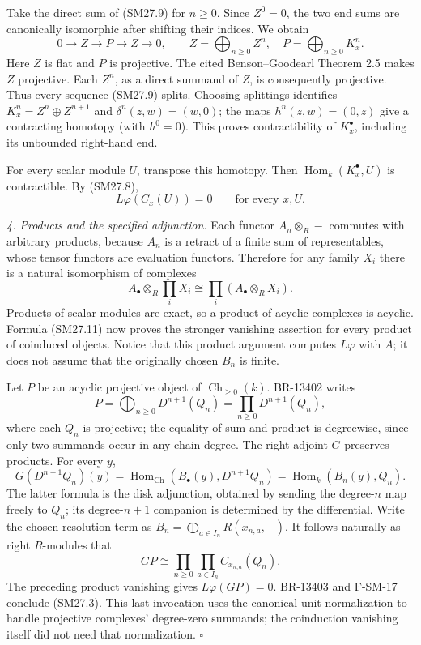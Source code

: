 \documentclass[11pt,a4paper]{article}
\theoremstyle{definition}\newtheorem{definition}[theorem]{Definition}
\theoremstyle{remark}\newtheorem{remark}[theorem]{Remark}
\begin{document}
Take the direct sum of (SM27.9) for \(n\ge0\).
Since \(Z^0=0\), the two end sums are canonically isomorphic after
shifting their indices.  We obtain
\[
 0\longrightarrow Z\longrightarrow P\longrightarrow Z
 \longrightarrow0,\qquad
 Z=\bigoplus_{n\ge0}Z^n,\quad P=\bigoplus_{n\ge0}K_x^n.
 \tag{SM27.10}
\]
Here \(Z\) is flat and \(P\) is projective.
The cited Benson--Goodearl Theorem 2.5 makes \(Z\) projective.
Each \(Z^n\), as a direct summand of \(Z\), is consequently
projective.  Thus every sequence (SM27.9) splits.
Choosing splittings identifies
\(K_x^n=Z^n\oplus Z^{n+1}\) and
\(\delta^n(z,w)=(w,0)\); the maps
\(h^n(z,w)=(0,z)\) give a contracting homotopy
(with \(h^0=0\)).  This proves contractibility of \(K_x^\bullet\),
including its unbounded right-hand end.

For every scalar module \(U\), transpose this homotopy.
Then \(\operatorname{Hom}_k(K_x^\bullet,U)\) is contractible.
By (SM27.8),
\[
 L\varphi(C_x(U))=0\qquad\text{for every }x,U.
 \tag{SM27.11}
\]

\emph{4. Products and the specified adjunction.}
Each functor \(A_n\otimes_R-\) commutes with arbitrary products,
because \(A_n\) is a retract of a finite sum of representables,
whose tensor functors are evaluation functors.
Therefore for any family \(X_i\) there is a natural isomorphism of
complexes
\[
 A_\bullet\otimes_R\prod_iX_i
   \cong\prod_i(A_\bullet\otimes_R X_i).
 \tag{SM27.12}
\]
Products of scalar modules are exact, so a product of acyclic
complexes is acyclic.  Formula (SM27.11) now proves the stronger
vanishing assertion for every product of coinduced objects.
Notice that this product argument computes \(L\varphi\) with \(A\);
it does not assume that the originally chosen \(B_n\) is finite.

Let \(P\) be an acyclic projective object of
\(\operatorname{Ch}_{\ge0}(k)\).  BR-13402 writes
\[
 P=\bigoplus_{n\ge0}D^{n+1}(Q_n)
   =\prod_{n\ge0}D^{n+1}(Q_n),
 \tag{SM27.13}
\]
where each \(Q_n\) is projective; the equality of sum and product is
degreewise, since only two summands occur in any chain degree.
The right adjoint \(G\) preserves products.  For every \(y\),
\[
 G(D^{n+1}Q_n)(y)
   =\operatorname{Hom}_{\mathrm{Ch}}(B_\bullet(y),D^{n+1}Q_n)
   =\operatorname{Hom}_k(B_n(y),Q_n).
\]
The latter formula is the disk adjunction, obtained by sending the
degree-\(n\) map freely to \(Q_n\); its degree-\(n+1\) companion is
determined by the differential.  Write the chosen resolution term as
\(B_n=\bigoplus_{a\in I_n}R(x_{n,a},-)\).
It follows naturally as right \(R\)-modules that
\[
 GP\cong\prod_{n\ge0}\prod_{a\in I_n}C_{x_{n,a}}(Q_n).
 \tag{SM27.14}
\]
The preceding product vanishing gives \(L\varphi(GP)=0\).
BR-13403 and F-SM-17 conclude (SM27.3).  This last invocation uses
the canonical unit normalization to handle projective complexes'
degree-zero summands; the coinduction vanishing itself did not need
that normalization. \(\square\)
\end{document}
